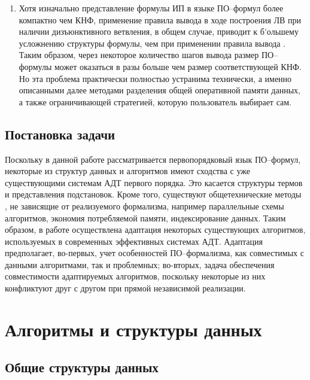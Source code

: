 \begin{enumerate}
\item Хотя изначально представление формулы ИП в языке ПО--формул более компактно чем КНФ, применение правила вывода в ходе построения ЛВ при наличии дизъюнктивного ветвления, в общем случае, приводит к б\'{}ольшему усложнению структуры формулы, чем при применении правила вывода . Таким образом, через некоторое количество шагов вывода размер ПО--формулы может оказаться в разы больше чем размер соответствующей КНФ. Но эта проблема практически полностью устранима технически, а именно описанными далее методами разделения общей оперативной памяти данных, а также ограничивающей стратегией, которую пользователь выбирает сам.
\end{enumerate}


\subsection{Постановка задачи}
Поскольку в данной работе рассматривается первопорядковый язык ПО--формул, некоторые из структур данных и алгоритмов имеют сходства с уже существующими системам АДТ первого порядка. Это касается структуры термов и представления подстановок. Кроме того, существуют общетехнические методы , не зависящие от реализуемого формализма, например параллельные схемы алгоритмов, экономия потребляемой памяти, индексирование данных. Таким образом, в работе осуществлена адаптация некоторых существующих алгоритмов, используемых в современных эффективных системах АДТ. Адаптация предполагает, во-первых, учет особенностей ПО--формализма, как совместимых с данными алгоритмами, так и проблемных; во-вторых,  задача обеспечения совместимости адаптируемых алгоритмов, поскольку некоторые из них конфликтуют друг с другом при прямой независимой реализации.



\section{Алгоритмы и структуры данных}

\subsection{Общие структуры данных}

